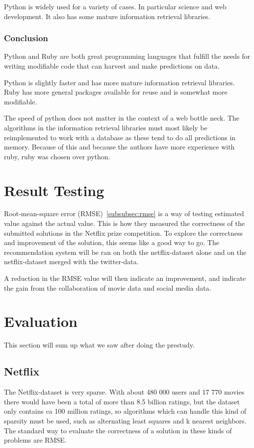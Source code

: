 Python is widely used for a variety of cases. In particular science and web development. It also has some mature information retrieval libraries.

\subsubsection{Conclusion}
Python and Ruby are both great programming languages that fulfill the needs for writing modifiable code that can harvest and make predictions on data.

Python is slightly faster and has more mature information retrieval libraries. Ruby has more general packages available for reuse and is somewhat more modifiable.

The speed of python does not matter in the context of a web bottle neck. The algorithms in the information retrieval libraries must most likely be reimplemented to work with a database as these tend to do all predictions in memory. Because of this and because the authors have more experience with ruby, ruby was chosen over python.


\section{Result Testing}
Root-mean-square error (RMSE)~\ref{subsubsec:rmse} is a way of testing estimated value against the actual value. This is how they measured the correctness of the submitted solutions in the Netflix prize competition. To explore the correctness and improvement of the solution, this seems like a good way to go. The recommendation system will be ran on both the netflix-dataset alone and on the netflix-dataset merged with the twitter-data.

A reduction in the RMSE value will then indicate an improvement, and indicate the gain from the collaboration of movie data and social media data.

\section{Evaluation}\label{sec:prestrud-eval}
This section will sum up what we saw after doing the prestudy.

\subsection{Netflix}
The Netflix-dataset is very sparse. With about 480 000 users and 17 770 movies there would have been a total of more than 8.5 billion ratings, but the dataset only contains ca 100 million ratings, so algorithms which can handle this kind of sparsity must be used, such as alternating least squares and k nearest neighbors. The standard way to evaluate the correctness of a solution in these kinds of problems are RMSE.

